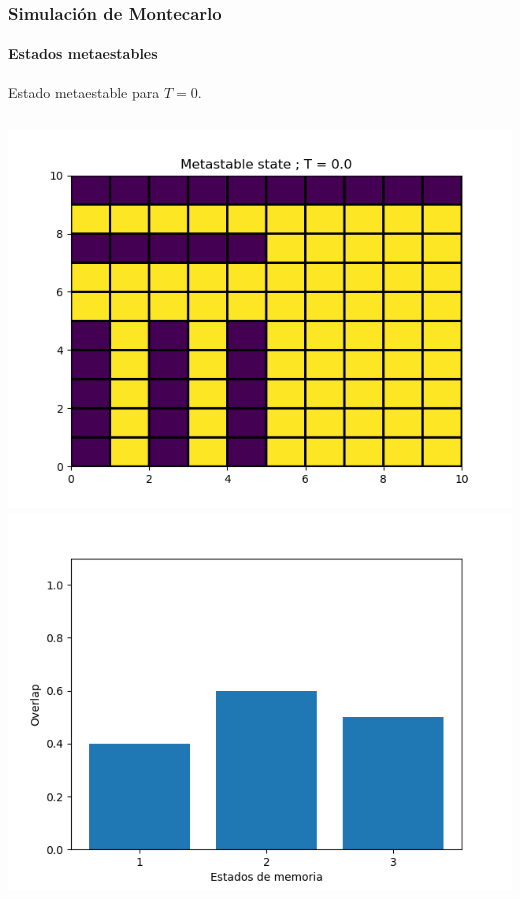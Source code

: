 \documentclass[11pt]{beamer}
\begin{document}
\begin{frame}
\frametitle{Simulación de Montecarlo}
\framesubtitle{Estados metaestables}
Estado metaestable para $T = 0$.
\begin{columns}
 \includegraphics[width=\linewidth]{meta_T=0,0.png}
 \includegraphics[width=\linewidth]{Metastable_overlap.png}
\end{columns}
\end{frame}
\end{document}

